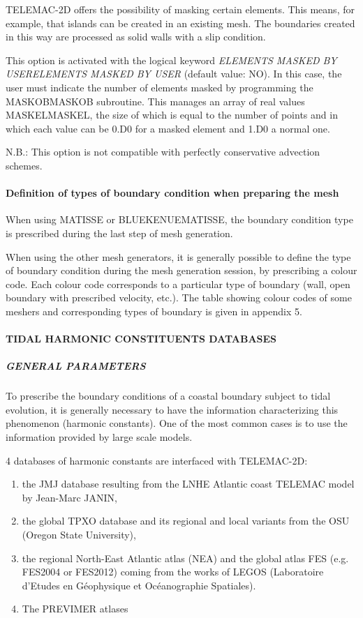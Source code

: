 \documentclass{article} %
\begin{document}
 TELEMAC-2D offers the possibility of masking certain elements. This means, for example, that islands can be created in an existing mesh. The boundaries created in this way are processed as solid walls with a slip condition.

 This option is activated with the logical keyword \textit{ELEMENTS MASKED BY USERELEMENTS MASKED BY USER} (default value: NO). In this case, the user must indicate the number of elements masked by programming the MASKOBMASKOB subroutine. This manages an array of real values MASKELMASKEL, the size of which is equal to the number of points and in which each value can be 0.D0 for a masked element and 1.D0 a normal one.

 N.B.: This option is not compatible with perfectly conservative advection schemes.


\paragraph{ Definition of types of boundary condition when preparing the mesh}

 When using MATISSE or BLUEKENUEMATISSE, the boundary condition type is prescribed during the last step of mesh generation.

 When using the other mesh generators, it is generally possible to define the type of boundary condition during the mesh generation session, by prescribing a colour code. Each colour code corresponds to a particular type of boundary (wall, open boundary with prescribed velocity, etc.). The table showing colour codes of some meshers and corresponding types of boundary is given in appendix 5.


\paragraph{ TIDAL HARMONIC CONSTITUENTS DATABASES}


\subparagraph{ GENERAL PARAMETERS}

 To prescribe the boundary conditions of a coastal boundary subject to tidal evolution, it is generally necessary to have the information characterizing this phenomenon (harmonic constants). One of the most common cases is to use the information provided by large scale models.

 4 databases of harmonic constants are interfaced with TELEMAC-2D:

\begin{enumerate}
\item  the JMJ database resulting from the LNHE Atlantic coast TELEMAC model by Jean-Marc JANIN,

\item  the global TPXO database and its regional and local variants from the OSU (Oregon State University),

\item  the regional North-East Atlantic atlas (NEA) and the global atlas FES (e.g. FES2004 or FES2012) coming from the works of LEGOS (Laboratoire d'Etudes en G\'{e}ophysique et Oc\'{e}anographie Spatiales).

\item  The PREVIMER atlases
\end{enumerate}
\end{document}

